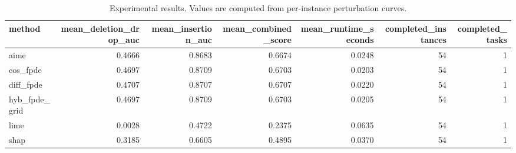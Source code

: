 \begin{table}[t]
\caption{Experimental results. Values are computed from per-instance perturbation curves.}
\label{tab:main_results_computed}
\centering
\begin{tabular}{lrrrrrr}
\toprule
method & mean\_deletion\_drop\_auc & mean\_insertion\_auc & mean\_combined\_score & mean\_runtime\_seconds & completed\_instances & completed\_tasks \\
\midrule
aime & 0.4666 & 0.8683 & 0.6674 & 0.0248 & 54 & 1 \\
cos\_fpde & 0.4697 & 0.8709 & 0.6703 & 0.0203 & 54 & 1 \\
diff\_fpde & 0.4707 & 0.8707 & 0.6707 & 0.0220 & 54 & 1 \\
hyb\_fpde\_grid & 0.4697 & 0.8709 & 0.6703 & 0.0205 & 54 & 1 \\
lime & 0.0028 & 0.4722 & 0.2375 & 0.0635 & 54 & 1 \\
shap & 0.3185 & 0.6605 & 0.4895 & 0.0370 & 54 & 1 \\
\bottomrule
\end{tabular}

\end{table}
